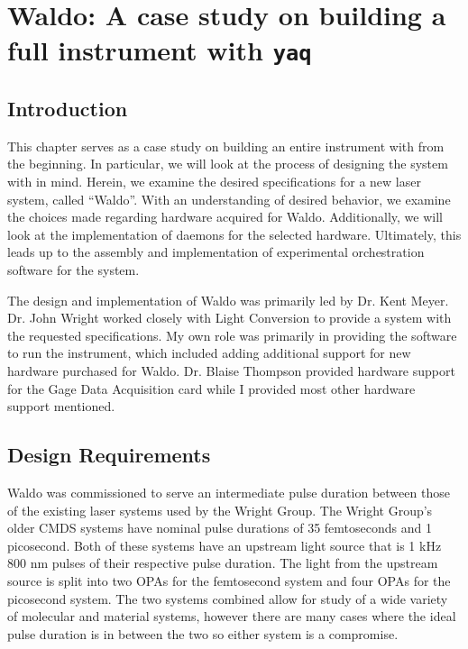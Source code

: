 \chapter{Waldo: A case study on building a full instrument with \texttt{yaq}} \label{cha:waldo}

\clearpage

\section{Introduction}  %

This chapter serves as a case study on building an entire instrument with \yaq{} from the beginning.
In particular, we will look at the process of designing the system with \yaq{} in mind.
Herein, we examine the desired specifications for a new laser system, called ``Waldo''.
With an understanding of desired behavior, we examine the choices made regarding hardware acquired for Waldo.
Additionally, we will look at the implementation of \yaq{} daemons for the selected hardware.
Ultimately, this leads up to the assembly and implementation of experimental orchestration software for the system.

The design and implementation of Waldo was primarily led by Dr. Kent Meyer.
Dr. John Wright worked closely with Light Conversion to provide a system with the requested specifications.
My own role was primarily in providing the software to run the instrument, which included adding additional support for new hardware purchased for Waldo.
Dr. Blaise Thompson provided hardware support for the Gage Data Acquisition card while I provided most other hardware support mentioned.


\clearpage

\section{Design Requirements}  %

Waldo was commissioned to serve an intermediate pulse duration between those of the existing laser systems used by the Wright Group.
The Wright Group's older CMDS systems have nominal pulse durations of 35 femtoseconds and 1 picosecond.
Both of these systems have an upstream light source that is 1 kHz 800 nm pulses of their respective pulse duration.
The light from the upstream source is split into two OPAs for the femtosecond system and four OPAs for the picosecond system.
The two systems combined allow for study of a wide variety of molecular and material systems, however there are many cases where the ideal pulse duration is in between the two so either system is a compromise.

